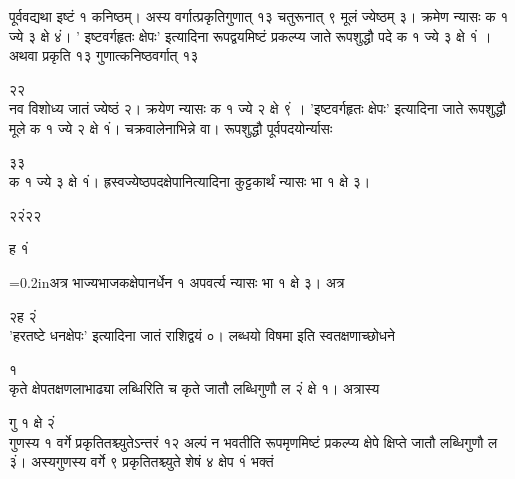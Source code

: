 \documentclass[11pt, openany]{book}
\begin{document}
\begin{sloppypar}
\hangindent=0.2in पूर्ववद्यथा इष्टं १ कनिष्ठम्। अस्य वर्गात्प्रकृतिगुणात् १३ चतुरूनात् ९ मूलं ज्येष्ठम् ३। क्रमेण न्यासः क १ ज्ये ३ क्षे ४ं। ' इष्टवर्गहृतः क्षेपः' इत्यादिना रूपद्वयमिष्टं प्रकल्प्य जाते रूपशुद्धौ पदे क १ ज्ये ३ क्षे १ं ।अथवा प्रकृति १३ गुणात्कनिष्ठवर्गात् १३

\hspace{0.2in}२\hspace{0.3in}२\\

\hangindent=0.2in नव विशोध्य जातं ज्येष्ठं २। क्रयेण न्यासः क १ ज्ये २ क्षे ९ं । 'इष्टवर्गहृतः क्षेपः' इत्यादिना जाते रूपशुद्धौ मूले क १ ज्ये २ क्षे १ं। चक्रवालेनाभिन्ने वा। रूपशुद्धौ पूर्वपदयोर्न्यासः

\hspace{1.1in}३\hspace{0.3in}३\\

\hangindent=0.2in क १ ज्ये ३ क्षे १ं। ह्रस्वज्येष्ठपदक्षेपानित्यादिना कुट्टकार्थं न्यासः भा १ क्षे ३।  

\hspace{0.2in}२\hspace{0.3in}२ं\hspace{3.5in}२\hspace{0.2in}२

\hspace{4in}ह १ं

\hangindent=0.2inअत्र भाज्यभाजकक्षेपानर्धेन १ अपवर्त्य न्यासः भा १ क्षे ३।
अत्र

\hspace{1.7in}२\hspace{1.05in}ह २ं\\

\hangindent=0.2in 'हरतष्टे धनक्षेपः' इत्यादिना जातं राशिद्वयं ०। लब्धयो विषमा इति स्वतक्षणाच्छोधने 

\hspace{2.6in}१\\

\hangindent=0.2in कृते क्षेपतक्षणलाभाढ्या लब्धिरिति च कृते जातौ लब्धिगुणौ ल २ं क्षे १। अत्रास्य

\hspace{3.7in}गु १ क्षे २ं\\

\hangindent=0.2in गुणस्य १ वर्गे प्रकृतितश्च्युतेऽन्तरं १२ अल्पं न भवतीति रूपमृणमिष्टं प्रकल्प्य क्षेपे क्षिप्ते जातौ लब्धिगुणौ ल ३ं। अस्यगुणस्य वर्गे ९ प्रकृतितश्च्युते शेषं ४ क्षेप १ं भक्तं


\end{sloppypar}
\end{document}
